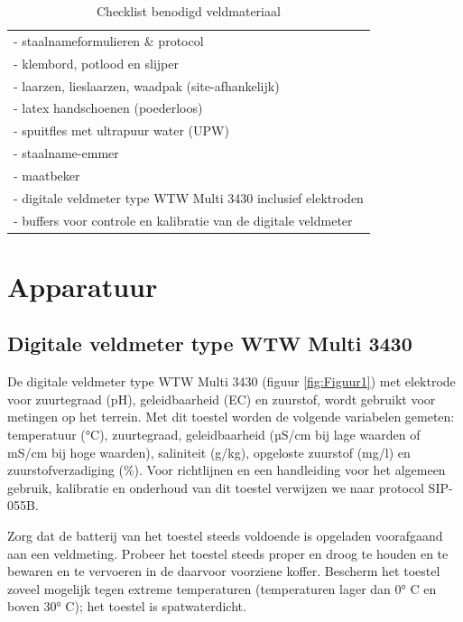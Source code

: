\documentclass[
]{scrreprt}
\begin{document}
\begin{longtable}[]{@{}l@{}}
\caption{\label{tab:Tabel1} Checklist benodigd veldmateriaal}\tabularnewline
\toprule\noalign{}
\endfirsthead
\endhead
\bottomrule\noalign{}
\endlastfoot
- staalnameformulieren \& protocol \\
- klembord, potlood en slijper \\
- laarzen, lieslaarzen, waadpak (site-afhankelijk) \\
- latex handschoenen (poederloos) \\
- spuitfles met ultrapuur water (UPW) \\
- staalname-emmer \\
- maatbeker \\
- digitale veldmeter type WTW Multi 3430 inclusief elektroden \\
- buffers voor controle en kalibratie van de digitale veldmeter \\
\end{longtable}

\hypertarget{apparatuur}{%
\section{Apparatuur}\label{apparatuur}}

\hypertarget{digitale-veldmeter-type-wtw-multi-3430}{%
\subsection{Digitale veldmeter type WTW Multi 3430}\label{digitale-veldmeter-type-wtw-multi-3430}}

De digitale veldmeter type WTW Multi 3430 (figuur \ref{fig:Figuur1}) met elektrode voor zuurtegraad (pH), geleidbaarheid (EC) en zuurstof, wordt gebruikt voor metingen op het terrein.
Met dit toestel worden de volgende variabelen gemeten: temperatuur (°C), zuurtegraad, geleidbaarheid (µS/cm bij lage waarden of mS/cm bij hoge waarden), saliniteit (g/kg), opgeloste zuurstof (mg/l) en zuurstofverzadiging (\%).
Voor richtlijnen en een handleiding voor het algemeen gebruik, kalibratie en onderhoud van dit toestel verwijzen we naar protocol SIP-055B.

Zorg dat de batterij van het toestel steeds voldoende is opgeladen voorafgaand aan een veldmeting.
Probeer het toestel steeds proper en droog te houden en te bewaren en te vervoeren in de daarvoor voorziene koffer.
Bescherm het toestel zoveel mogelijk tegen extreme temperaturen (temperaturen lager dan 0° C en boven 30° C); het toestel is spatwaterdicht.
\end{document}
